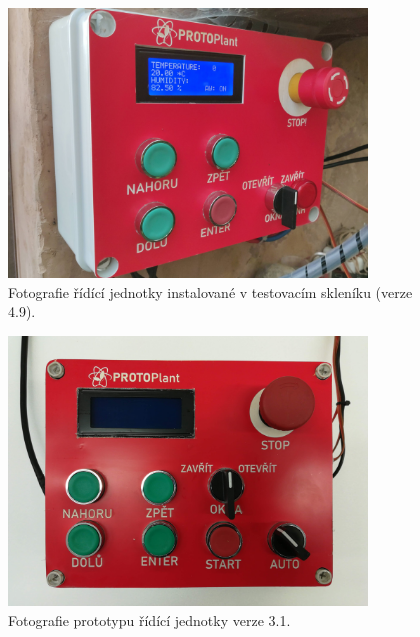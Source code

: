 \begin{figure}[htbp]
    \centering
    \includegraphics[width=0.85\textwidth]{img/PHOTOS/ControlUnit1.jpg}
    \caption{Fotografie řídící jednotky instalované v testovacím skleníku (verze 4.9).}
    \label{fig:PPCU1}
\end{figure}

\begin{figure}[htbp]
    \centering
    \includegraphics[width=0.85\textwidth]{img/PHOTOS/ControlUnit2.jpg}
    \caption{Fotografie prototypu řídící jednotky verze 3.1.}
    \label{fig:PPCU2}
\end{figure}

